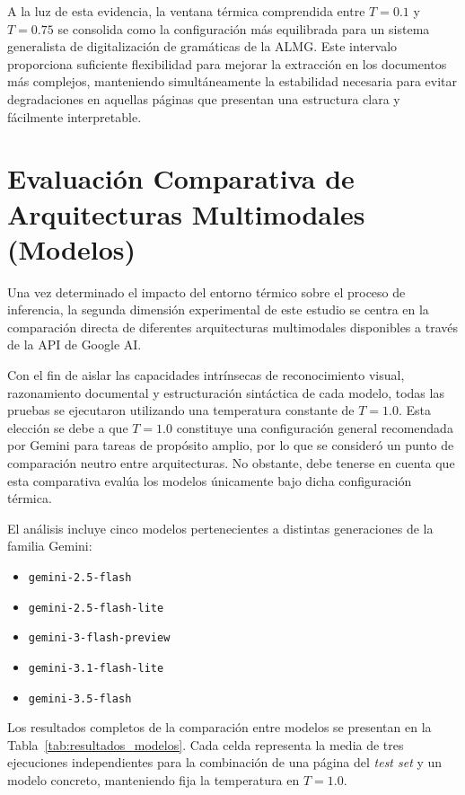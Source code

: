 A la luz de esta evidencia, la ventana térmica comprendida entre \(T=0.1\) y \(T=0.75\) se consolida como la configuración más equilibrada para un sistema generalista de digitalización de gramáticas de la ALMG. Este intervalo proporciona suficiente flexibilidad para mejorar la extracción en los documentos más complejos, manteniendo simultáneamente la estabilidad necesaria para evitar degradaciones en aquellas páginas que presentan una estructura clara y fácilmente interpretable.



\section{Evaluación Comparativa de Arquitecturas Multimodales (Modelos)}

Una vez determinado el impacto del entorno térmico sobre el proceso de inferencia, la segunda dimensión experimental de este estudio se centra en la comparación directa de diferentes arquitecturas multimodales disponibles a través de la API de Google AI.

Con el fin de aislar las capacidades intrínsecas de reconocimiento visual, razonamiento documental y estructuración sintáctica de cada modelo, todas las pruebas se ejecutaron utilizando una temperatura constante de \(T=1.0\). Esta elección se debe a que \(T=1.0\) constituye una configuración general recomendada por Gemini para tareas de propósito amplio, por lo que se consideró un punto de comparación neutro entre arquitecturas. No obstante, debe tenerse en cuenta que esta comparativa evalúa los modelos únicamente bajo dicha configuración térmica.

El análisis incluye cinco modelos pertenecientes a distintas generaciones de la familia Gemini:

\begin{itemize}
    \item \texttt{gemini-2.5-flash}
    \item \texttt{gemini-2.5-flash-lite}
    \item \texttt{gemini-3-flash-preview}
    \item \texttt{gemini-3.1-flash-lite}
    \item \texttt{gemini-3.5-flash}
\end{itemize}

Los resultados completos de la comparación entre modelos se presentan en la Tabla~\ref{tab:resultados_modelos}. Cada celda representa la media de tres ejecuciones independientes para la combinación de una página del \textit{test set} y un modelo concreto, manteniendo fija la temperatura en \(T=1.0\).

